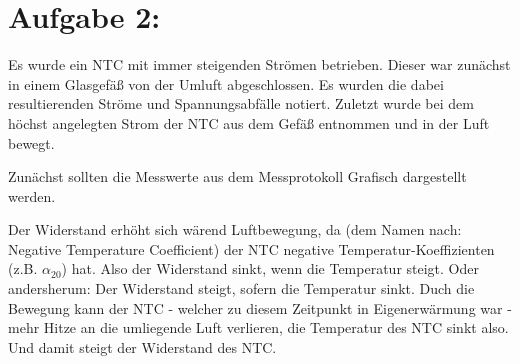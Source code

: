 \documentclass[]{article}
\begin{document}
\section*{Aufgabe 2:}
\begin{samepage}
	Es wurde ein NTC mit immer steigenden Strömen betrieben. Dieser war zunächst in einem Glasgefäß von der Umluft abgeschlossen. Es wurden die dabei resultierenden Ströme und Spannungsabfälle notiert. Zuletzt wurde bei dem höchst angelegten Strom der NTC aus dem Gefäß entnommen und in der Luft bewegt.

	Zunächst sollten die Messwerte aus dem Messprotokoll Grafisch dargestellt werden.
	\begin{center}
	\end{center}

	Der Widerstand erhöht sich wärend Luftbewegung, da (dem Namen nach: Negative Temperature Coefficient) der NTC negative Temperatur-Koeffizienten (z.B. $\alpha_{20}$) hat. Also der Widerstand sinkt, wenn die Temperatur steigt. Oder andersherum: Der Widerstand steigt, sofern die Temperatur sinkt. Duch die Bewegung kann der NTC - welcher zu diesem Zeitpunkt in Eigenerwärmung war - mehr Hitze an die umliegende Luft verlieren, die Temperatur des NTC sinkt also. Und damit steigt der Widerstand des NTC.
\end{samepage}
\end{document}
